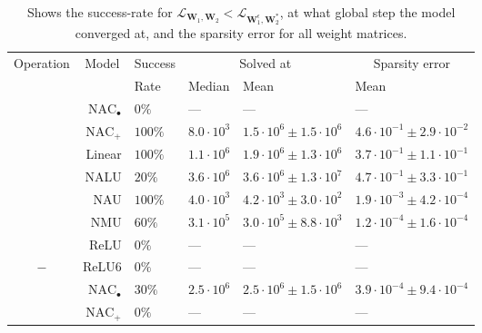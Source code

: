 \begin{table}[H]

\caption{\label{tab:function-task-static-defaults-all}Shows the success-rate for $\mathcal{L}_{\mathbf{W}_1, \mathbf{W}_2} < \mathcal{L}_{\mathbf{W}_1^\epsilon, \mathbf{W}_2^*}$, at what global step the model converged at, and the sparsity error for all weight matrices.}
\centering
\begin{tabular}{crllll}
\toprule
\multicolumn{1}{c}{Operation} & \multicolumn{1}{c}{Model} & \multicolumn{1}{c}{Success} & \multicolumn{2}{c}{Solved at} & \multicolumn{1}{c}{Sparsity error} \\
\cmidrule(l{3pt}r{3pt}){1-1} \cmidrule(l{3pt}r{3pt}){2-2} \cmidrule(l{3pt}r{3pt}){3-3} \cmidrule(l{3pt}r{3pt}){4-5} \cmidrule(l{3pt}r{3pt}){6-6}
 &  & Rate & Median & Mean & Mean\\
\midrule
 & $\mathrm{NAC}_{\bullet}$ & $0\%$ & --- & --- & ---\\

 & $\mathrm{NAC}_{+}$ & $100\%$ & $8.0 \cdot 10^{3}$ & $1.5 \cdot 10^{6} \pm 1.5 \cdot 10^{6}$ & $4.6 \cdot 10^{-1} \pm 2.9 \cdot 10^{-2}$\\

 & Linear & $100\%$ & $1.1 \cdot 10^{6}$ & $1.9 \cdot 10^{6} \pm 1.3 \cdot 10^{6}$ & $3.7 \cdot 10^{-1} \pm 1.1 \cdot 10^{-1}$\\

 & NALU & $20\%$ & $3.6 \cdot 10^{6}$ & $3.6 \cdot 10^{6} \pm 1.3 \cdot 10^{7}$ & $4.7 \cdot 10^{-1} \pm 3.3 \cdot 10^{-1}$\\

 & NAU & $100\%$ & $4.0 \cdot 10^{3}$ & $4.2 \cdot 10^{3} \pm 3.0 \cdot 10^{2}$ & $1.9 \cdot 10^{-3} \pm 4.2 \cdot 10^{-4}$\\

 & NMU & $60\%$ & $3.1 \cdot 10^{5}$ & $3.0 \cdot 10^{5} \pm 8.8 \cdot 10^{3}$ & $1.2 \cdot 10^{-4} \pm 1.6 \cdot 10^{-4}$\\

 & ReLU & $0\%$ & --- & --- & ---\\

\multirow{-8}{*}{\centering\arraybackslash $\bm{-}$} & ReLU6 & $0\%$ & --- & --- & ---\\
\cmidrule{1-6}
 & $\mathrm{NAC}_{\bullet}$ & $30\%$ & $2.5 \cdot 10^{6}$ & $2.5 \cdot 10^{6} \pm 1.5 \cdot 10^{6}$ & $3.9 \cdot 10^{-4} \pm 9.4 \cdot 10^{-4}$\\

 & $\mathrm{NAC}_{+}$ & $0\%$ & --- & --- & ---\\


\end{tabular}
\end{table}
